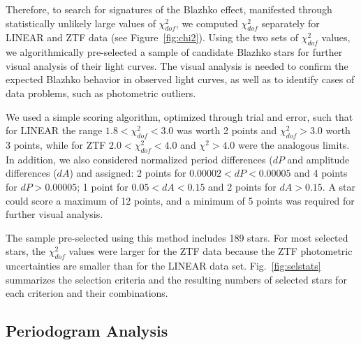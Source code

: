 Therefore, to search for signatures of the Blazhko effect, manifested through statistically unlikely large values
of $\chi^2_{dof}$, we computed $\chi^2_{dof}$ separately for LINEAR and ZTF data (see Figure~\ref{fig:chi2}). 
Using the two sets of $\chi^2_{dof}$ values, we algorithmically pre-selected a sample of candidate Blazhko stars
for further visual analysis of their light curves. The visual analysis is needed to confirm the expected Blazhko behavior
in observed light curves, as well as to identify cases of data problems, such as photometric outliers. 

We used a simple scoring algorithm, optimized through trial and error,
such that for LINEAR the range $1.8<\chi^2_{dof}<3.0$ was worth 2 points and $\chi^2_{dof}>3.0$ worth 3 points,
while for ZTF $2.0<\chi^2_{dof}<4.0$ and $\chi^2>4.0$ were the analogous limits. In addition, we also considered
normalized period differences ($dP$ and amplitude differences ($dA$) and assigned: 2 points for $0.00002 < dP < 0.00005$
and 4 points for $dP > 0.00005$; 1 point for $0.05 < dA < 0.15$ and 2 points for $dA > 0.15$. 
A star could score a maximum of 12 points, and a minimum of 5 points was required for further visual analysis. 

The sample pre-selected using this method includes 189 stars. For most selected stars, the $\chi^2_{dof}$ values were
larger for the ZTF data because the ZTF photometric uncertainties are smaller than for the LINEAR data set. 
Fig.~\ref{fig:selstats} summarizes the selection criteria and the resulting numbers of selected stars for each
criterion and their combinations. 
 


\subsection{Periodogram Analysis} 


